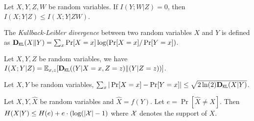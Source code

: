 \begin{fact}
\label{fact:it2}
Let $X,Y,Z,W$ be random variables. If $I(Y;W|Z) = 0$, then $I(X;Y|Z) \leq I(X;Y|ZW)$. 
\end{fact}

\begin{definition}
The \emph{Kullback-Leibler divergence} between two random variables $X$ and $Y$ is defined as $\textbf{D}_{\mathtt{KL}}(X\| Y) = \sum_x \Pr[X = x] \log(\Pr[X = x] / \Pr[Y = x])$. 
\end{definition}

\begin{fact}
\label{fact:div}
Let $X,Y,Z$ be random variables, we have $I(X;Y|Z) = \mathbb{E}_{x,z}[\textbf{D}_{\mathtt{KL}}((Y|X = x, Z=z)\|(Y|Z=z))]$.
\end{fact}

\begin{lemma}
Let $X,Y$ be random variables, $\sum_x | \Pr[X=x] - \Pr[Y=x]| \leq \sqrt{2 \ln(2) \textbf{D}_{\mathtt{KL}}(X|Y)}$.
\end{lemma}

\begin{lemma}
Let $X,Y,\hat{X}$ be random variables and $\hat{X} = f(Y)$. Let $e = \Pr[\hat{X} \neq X]$. Then $H(X|Y) \leq H(e) + e \cdot (\log(|\mathcal{X}|-1)$ where $\mathcal{X}$ denotes the support of $X$.
\end{lemma}